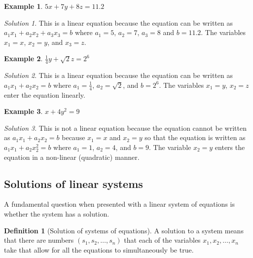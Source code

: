 \documentclass[
]{book}
\theoremstyle{definition}
\newtheorem{definition}{Definition}[chapter]
\theoremstyle{definition}
\newtheorem{example}{Example}[chapter]
\theoremstyle{definition}
\theoremstyle{definition}
\theoremstyle{remark}
\newtheorem*{solution}{Solution}
\begin{document}
\begin{example}
\(5x + 7y + 8z = 11.2\)
\end{example}

\begin{solution}
This is a linear equation because the equation can be written as \(a_1 x_1 + a_2 x_2 + a_3 x_3= b\) where \(a_1 = 5\), \(a_2 = 7\), \(a_3 = 8\) and \(b = 11.2\). The variables \(x_1 = x\), \(x_2 = y\), and \(x_3 = z\).
\end{solution}

\begin{example}
\(\frac{1}{4} y + \sqrt{2} z = 2^6\)
\end{example}

\begin{solution}
This is a linear equation because the equation can be written as \(a_1 x_1 + a_2 x_2 = b\) where \(a_1 = \frac{1}{4}\), \(a_2 = \sqrt{2}\), and \(b = 2^6\). The variables \(x_1 = y\), \(x_2 = z\) enter the equation linearly.
\end{solution}

\begin{example}
\(x + 4 y^2 = 9\)
\end{example}

\begin{solution}
This is not a linear equation because the equation cannot be written as \(a_1 x_1 + a_2 x_2 = b\) because \(x_1 = x\) and \(x_2 = y\) so that the equation is written as \(a_1 x_1 + a_2 x_2^2 = b\) where \(a_1 = 1\), \(a_2 = 4\), and \(b = 9\). The variable \(x_2 = y\) enters the equation in a non-linear (quadratic) manner.
\end{solution}

\hypertarget{solutions-of-linear-systems}{%
\subsection{Solutions of linear systems}\label{solutions-of-linear-systems}}

A fundamental question when presented with a linear system of equations is whether the system has a solution.

\begin{definition}[Solution of systems of equations]
A solution to a system means that there are numbers \((s_1, s_2, \ldots, s_n)\) that each of the variables \(x_1, x_2, \ldots, x_n\) take that allow for all the equations to simultaneously be true.
\end{definition}
\end{document}

